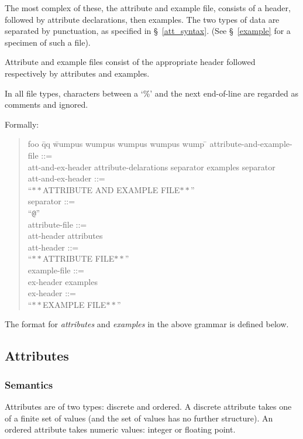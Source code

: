 The most complex of these, the attribute and example file, 
consists of a header, followed by attribute declarations,
then examples.  The two types of data are separated by punctuation,
as specified in \S~\ref{att_syntax}.
(See \S~\ref{example} for a specimen of
such a file).

Attribute and example files consist of the 
appropriate header followed respectively by attributes and examples.

In all file types, characters between a `\%' and the next end-of-line 
are regarded as comments and ignored.

Formally: 
\begin{quotation} \sf
\begin{tabbing}
foo \= qq \= wumpus wumpus wumpus wumpus wump \= \kill
attribute-and-example-file ::= \\
\>\>   att-and-ex-header \gap attribute-delarations \gap
                          separator \gap examples \gap separator \\[1.5ex]
att-and-ex-header ::=  \\
\>\>   ``$\ast\ast$ATTRIBUTE AND EXAMPLE FILE$\ast\ast$'' \\[1.5ex]
separator ::=  \\
\>\>   ``\verb+@+'' \\[2.5ex]
attribute-file ::= \\
\>\>   att-header \gap attributes \\[1.5ex]
att-header ::= \\
\>\>   ``$\ast\ast$ATTRIBUTE FILE$\ast\ast$'' \\[2.5ex]
example-file ::= \\
\>\>   ex-header \gap examples \\[1.5ex]
ex-header ::=  \\
\>\>   ``$\ast\ast$EXAMPLE FILE$\ast\ast$''
\end{tabbing}
\end{quotation}
The format for {\it attributes} and {\it examples} in the above
grammar is defined below.

\subsection{Attributes}
\subsubsection{Semantics}
Attributes are of two types: discrete and ordered.  A discrete 
attribute takes one of a finite set of values (and the set of values
has no further structure).  An ordered attribute takes numeric
values: integer or floating point.

